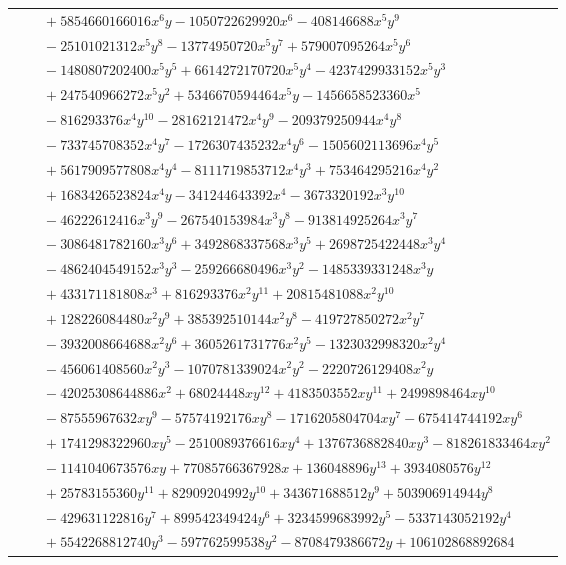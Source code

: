 \documentclass[11pt]{article}
\begin{document}
\begin{longtable}{@{}ll@{}}
 & $\quad +5854660166016x^{6}y-1050722629920x^{6}-408146688x^{5}y^{9}$\\
 & $\quad -25101021312x^{5}y^{8}-13774950720x^{5}y^{7}+579007095264x^{5}y^{6}$\\
 & $\quad -1480807202400x^{5}y^{5}+6614272170720x^{5}y^{4}-4237429933152x^{5}y^{3}$\\
 & $\quad +247540966272x^{5}y^{2}+5346670594464x^{5}y-1456658523360x^{5}$\\
 & $\quad -816293376x^{4}y^{10}-28162121472x^{4}y^{9}-209379250944x^{4}y^{8}$\\
 & $\quad -733745708352x^{4}y^{7}-1726307435232x^{4}y^{6}-1505602113696x^{4}y^{5}$\\
 & $\quad +5617909577808x^{4}y^{4}-8111719853712x^{4}y^{3}+753464295216x^{4}y^{2}$\\
 & $\quad +1683426523824x^{4}y-341244643392x^{4}-3673320192x^{3}y^{10}$\\
 & $\quad -46222612416x^{3}y^{9}-267540153984x^{3}y^{8}-913814925264x^{3}y^{7}$\\
 & $\quad -3086481782160x^{3}y^{6}+3492868337568x^{3}y^{5}+2698725422448x^{3}y^{4}$\\
 & $\quad -4862404549152x^{3}y^{3}-259266680496x^{3}y^{2}-1485339331248x^{3}y$\\
 & $\quad +433171181808x^{3}+816293376x^{2}y^{11}+20815481088x^{2}y^{10}$\\
 & $\quad +128226084480x^{2}y^{9}+385392510144x^{2}y^{8}-419727850272x^{2}y^{7}$\\
 & $\quad -3932008664688x^{2}y^{6}+3605261731776x^{2}y^{5}-1323032998320x^{2}y^{4}$\\
 & $\quad -456061408560x^{2}y^{3}-1070781339024x^{2}y^{2}-2220726129408x^{2}y$\\
 & $\quad -42025308644886x^{2}+68024448xy^{12}+4183503552xy^{11}+2499898464xy^{10}$\\
 & $\quad -87555967632xy^{9}-57574192176xy^{8}-1716205804704xy^{7}-675414744192xy^{6}$\\
 & $\quad +1741298322960xy^{5}-2510089376616xy^{4}+1376736882840xy^{3}-818261833464xy^{2}$\\
 & $\quad -1141040673576xy+77085766367928x+136048896y^{13}+3934080576y^{12}$\\
 & $\quad +25783155360y^{11}+82909204992y^{10}+343671688512y^{9}+503906914944y^{8}$\\
 & $\quad -429631122816y^{7}+899542349424y^{6}+3234599683992y^{5}-5337143052192y^{4}$\\
 & $\quad +5542268812740y^{3}-597762599538y^{2}-8708479386672y+106102868892684$\\

\end{longtable}
\end{document}
